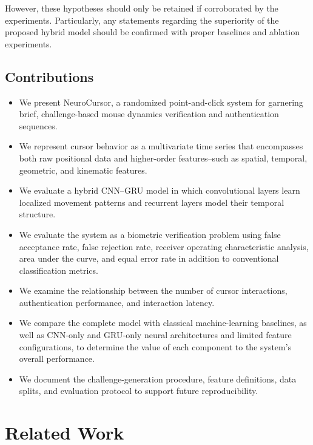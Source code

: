 \documentclass[conference]{IEEEtran}
\begin{document}
However, these hypotheses should only be retained if corroborated by the experiments. Particularly, any statements regarding the superiority of the proposed hybrid model should be confirmed with proper baselines and ablation experiments. 

\subsection{Contributions}
\begin{itemize}
    \item We present NeuroCursor, a randomized point-and-click system for garnering brief, challenge-based mouse dynamics verification and authentication sequences. 

    \item We represent cursor behavior as a multivariate time series that encompasses both raw positional data and higher-order features--such as spatial, temporal, geometric, and kinematic features. 

    \item We evaluate a hybrid CNN--GRU model in which convolutional layers learn localized movement patterns and recurrent layers model their temporal structure. 

    \item We evaluate the system as a biometric verification problem using false acceptance rate, false rejection rate, receiver operating characteristic analysis, area under the curve, and equal error rate in addition to conventional classification metrics. 

    \item We examine the relationship between the number of cursor interactions, authentication performance, and interaction latency. 

    \item We compare the complete model with classical machine-learning baselines, as well as CNN-only and GRU-only neural architectures and limited feature configurations, to determine the value of each component to the system's overall performance. 
    
    \item We document the challenge-generation procedure, feature definitions, data splits, and evaluation protocol to support future reproducibility.
\end{itemize}

\section{Related Work}
\end{document}
